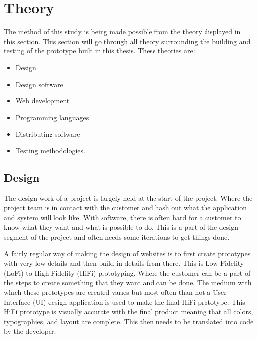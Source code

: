 \section{Theory}

The method of this study is being made possible from the theory displayed in this section. This section will go through all theory surrounding the building and testing of the prototype built in this thesis. These theories are: 
\begin{itemize}
  \item Design
  \item Design software
  \item Web development
  \item Programming languages
  \item Distributing software
  \item Testing methodologies. 
\end{itemize}





\subsection{Design}%
\label{sub:Design}
The design work of a project is largely held at the start of the project. Where the project team is in contact with the customer and hash out what the application and system will look like. With software, there is often hard for a customer to know what they want and what is possible to do. This is a part of the design segment of the project and often needs some iterations to get things done. 

A fairly regular way of making the design of websites is to first create prototypes with very low details and then build in details from there. This is Low Fidelity (LoFi) to High Fidelity (HiFi) prototyping. Where the customer can be a part of the steps to create something that they want and can be done. The medium with which these prototypes are created varies but most often than not a User Interface (UI) design application is used to make the final HiFi prototype. This HiFi prototype is visually accurate with the final product meaning that all colors, typographies, and layout are complete. This then needs to be translated into code by the developer.

